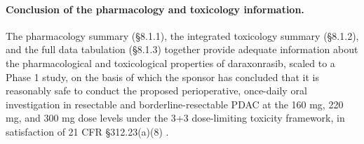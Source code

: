 \paragraph{Conclusion of the pharmacology and toxicology information.}
The pharmacology summary (\S 8.1.1), the integrated toxicology summary
(\S 8.1.2), and the full data tabulation (\S 8.1.3) together provide adequate
information about the pharmacological and toxicological properties of
daraxonrasib, scaled to a Phase 1 study, on the basis of which the sponsor has
concluded that it is reasonably safe to conduct the proposed perioperative,
once-daily oral investigation in resectable and borderline-resectable PDAC at the
160 mg, 220 mg, and 300 mg dose levels under the 3+3 dose-limiting toxicity
framework, in satisfaction of 21 CFR \S 312.23(a)(8)
\cite{phase1guidance,cfr312paiuni,daraxwhipple}.
